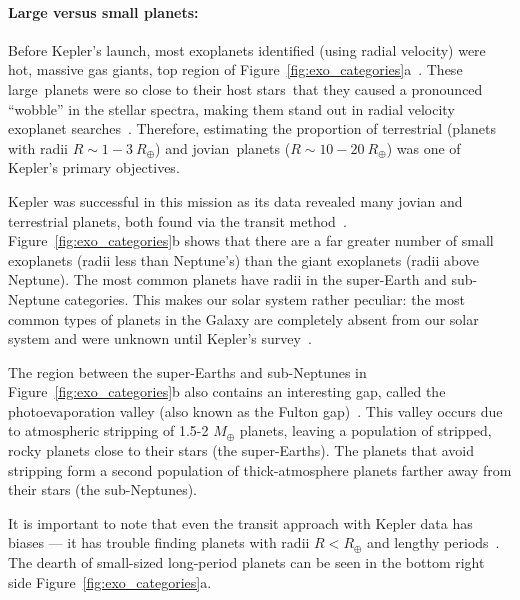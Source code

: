 % 

\paragraph{Large versus small planets:}
Before Kepler's launch, most exoplanets identified (using radial velocity) were hot, massive gas giants, top region of Figure~\ref{fig:exo_categories}a~\cite{kepler_mission}.
These large planets were so close to their host stars that they caused a pronounced ``wobble'' in the stellar spectra, making them stand out in radial velocity exoplanet searches~\cite{kepler_mission}.
Therefore, estimating  the proportion of terrestrial (planets with radii $R\sim1-3\ R_{\oplus}$)  and jovian planets  ($R\sim10-20\ R_{\oplus}$) was one of Kepler's primary objectives.

Kepler was successful in this mission as its data revealed many jovian and terrestrial planets, both found via the transit method~\cite{kepler_mission}.
Figure~\ref{fig:exo_categories}b shows that there are a far greater number of small exoplanets (radii less than Neptune's) than the giant exoplanets (radii above Neptune).
The most common planets have radii in the super-Earth and sub-Neptune categories. 
This makes our solar system rather peculiar: the most common types of planets in the Galaxy are completely absent from our solar system and were unknown until Kepler’s survey~\cite{Oppenheimer:2016:Sci}.

The region between the super-Earths and sub-Neptunes in Figure~\ref{fig:exo_categories}b also contains an interesting gap, called the photoevaporation valley (also known as the Fulton gap)~\cite{Owen:2013:ApJ, VanEylen:2018:MNRAS}. 
This valley occurs due to atmospheric stripping of 1.5-2 $M_{\oplus}$ planets, leaving a population of stripped, rocky planets close to their stars (the super-Earths). 
The planets that avoid stripping form a second population of thick-atmosphere planets farther away from their stars (the sub-Neptunes).

It is important to note that even the transit approach with Kepler data has biases — it has trouble finding planets with radii $R<R_{\oplus}$ and lengthy periods~\cite{kepler_mission}.
The dearth of small-sized long-period planets can be seen in the bottom right side Figure~\ref{fig:exo_categories}a.


